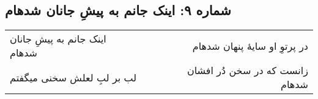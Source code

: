 \begin{center}
\section*{شماره ۹: اینک جانم به پیشِ جانان شدهام}
\label{sec:009}
\begin{longtable}{l p{0.5cm} r}
اینک جانم به پیشِ جانان شدهام
&&
در پرتوِ او سایهٔ پنهان شدهام
\\
لب بر لبِ لعلش سخنی میگفتم
&&
زانست که در سخن دُر افشان شدهام
\\
\end{longtable}
\end{center}
